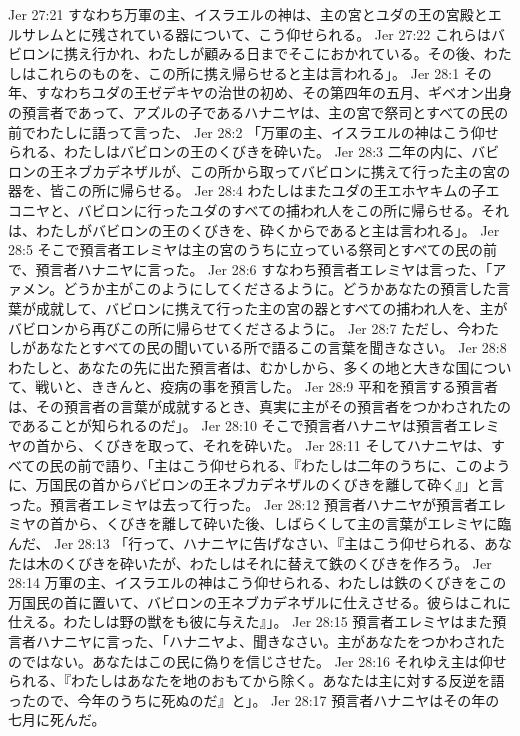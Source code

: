 Jer 27:21  すなわち万軍の主、イスラエルの神は、主の宮とユダの王の宮殿とエルサレムとに残されている器について、こう仰せられる。
Jer 27:22  これらはバビロンに携え行かれ、わたしが顧みる日までそこにおかれている。その後、わたしはこれらのものを、この所に携え帰らせると主は言われる」。
Jer 28:1  その年、すなわちユダの王ゼデキヤの治世の初め、その第四年の五月、ギベオン出身の預言者であって、アズルの子であるハナニヤは、主の宮で祭司とすべての民の前でわたしに語って言った、
Jer 28:2  「万軍の主、イスラエルの神はこう仰せられる、わたしはバビロンの王のくびきを砕いた。
Jer 28:3  二年の内に、バビロンの王ネブカデネザルが、この所から取ってバビロンに携えて行った主の宮の器を、皆この所に帰らせる。
Jer 28:4  わたしはまたユダの王エホヤキムの子エコニヤと、バビロンに行ったユダのすべての捕われ人をこの所に帰らせる。それは、わたしがバビロンの王のくびきを、砕くからであると主は言われる」。
Jer 28:5  そこで預言者エレミヤは主の宮のうちに立っている祭司とすべての民の前で、預言者ハナニヤに言った。
Jer 28:6  すなわち預言者エレミヤは言った、「アァメン。どうか主がこのようにしてくださるように。どうかあなたの預言した言葉が成就して、バビロンに携えて行った主の宮の器とすべての捕われ人を、主がバビロンから再びこの所に帰らせてくださるように。
Jer 28:7  ただし、今わたしがあなたとすべての民の聞いている所で語るこの言葉を聞きなさい。
Jer 28:8  わたしと、あなたの先に出た預言者は、むかしから、多くの地と大きな国について、戦いと、ききんと、疫病の事を預言した。
Jer 28:9  平和を預言する預言者は、その預言者の言葉が成就するとき、真実に主がその預言者をつかわされたのであることが知られるのだ」。
Jer 28:10  そこで預言者ハナニヤは預言者エレミヤの首から、くびきを取って、それを砕いた。
Jer 28:11  そしてハナニヤは、すべての民の前で語り、「主はこう仰せられる、『わたしは二年のうちに、このように、万国民の首からバビロンの王ネブカデネザルのくびきを離して砕く』」と言った。預言者エレミヤは去って行った。
Jer 28:12  預言者ハナニヤが預言者エレミヤの首から、くびきを離して砕いた後、しばらくして主の言葉がエレミヤに臨んだ、
Jer 28:13  「行って、ハナニヤに告げなさい、『主はこう仰せられる、あなたは木のくびきを砕いたが、わたしはそれに替えて鉄のくびきを作ろう。
Jer 28:14  万軍の主、イスラエルの神はこう仰せられる、わたしは鉄のくびきをこの万国民の首に置いて、バビロンの王ネブカデネザルに仕えさせる。彼らはこれに仕える。わたしは野の獣をも彼に与えた』」。
Jer 28:15  預言者エレミヤはまた預言者ハナニヤに言った、「ハナニヤよ、聞きなさい。主があなたをつかわされたのではない。あなたはこの民に偽りを信じさせた。
Jer 28:16  それゆえ主は仰せられる、『わたしはあなたを地のおもてから除く。あなたは主に対する反逆を語ったので、今年のうちに死ぬのだ』と」。
Jer 28:17  預言者ハナニヤはその年の七月に死んだ。
